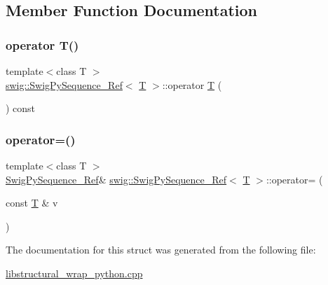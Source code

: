 \subsection{Member Function Documentation}
\mbox{\label{structswig_1_1_swig_py_sequence___ref_a148e950c46eb0a1531513453dfc35482}} 
\subsubsection{\texorpdfstring{operator T()}{operator T()}}
{\footnotesize\ttfamily template$<$class T $>$ \\
\hyperlink{structswig_1_1_swig_py_sequence___ref}{swig\+::\+Swig\+Py\+Sequence\+\_\+\+Ref}$<$ \hyperlink{fmt_8h_a0acb682b8260ab1c60b918599864e2e5}{T} $>$\+::operator \hyperlink{fmt_8h_a0acb682b8260ab1c60b918599864e2e5}{T} (\begin{DoxyParamCaption}{ }\end{DoxyParamCaption}) const\hspace{0.3cm}{\ttfamily [inline]}}

\mbox{\label{structswig_1_1_swig_py_sequence___ref_a71732475dadcaebf7e61bd5377199ee2}} 
\subsubsection{\texorpdfstring{operator=()}{operator=()}}
{\footnotesize\ttfamily template$<$class T $>$ \\
\hyperlink{structswig_1_1_swig_py_sequence___ref}{Swig\+Py\+Sequence\+\_\+\+Ref}\& \hyperlink{structswig_1_1_swig_py_sequence___ref}{swig\+::\+Swig\+Py\+Sequence\+\_\+\+Ref}$<$ \hyperlink{fmt_8h_a0acb682b8260ab1c60b918599864e2e5}{T} $>$\+::operator= (\begin{DoxyParamCaption}\item[{const \hyperlink{fmt_8h_a0acb682b8260ab1c60b918599864e2e5}{T} \&}]{v }\end{DoxyParamCaption})\hspace{0.3cm}{\ttfamily [inline]}}



The documentation for this struct was generated from the following file\+:\begin{DoxyCompactItemize}
\item 
\hyperlink{libstructural__wrap__python_8cpp}{libstructural\+\_\+wrap\+\_\+python.\+cpp}\end{DoxyCompactItemize}
